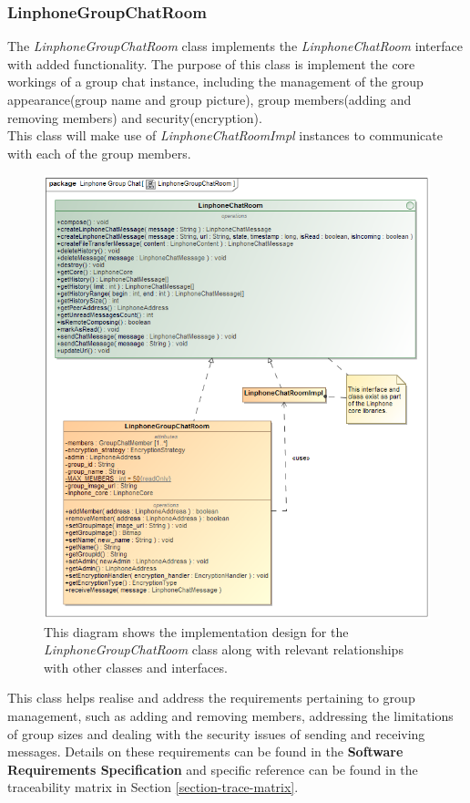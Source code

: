 \documentclass[11pt]{article}
\begin{document}
\subsubsection{LinphoneGroupChatRoom}\label{subsubsec: linphonegroupchatroom}
The \textit{LinphoneGroupChatRoom} class implements the \textit{LinphoneChatRoom} interface with added functionality. The purpose of this class is implement the core workings of a group chat instance, including the management of the group appearance(group name and group picture), group members(adding and removing members) and security(encryption).\\
This class will make use of \textit{LinphoneChatRoomImpl} instances to communicate with each of the group members.
\begin{figure}[H]
\centering
\includegraphics[width=5in]{./images/class_group_chat.png}
\caption[LinphoneGroupChatRoom Clas Diagram]{This diagram shows the implementation design for the \textit{LinphoneGroupChatRoom} class along with relevant relationships with other classes and interfaces.}
\label{cd-group-chat}
\end{figure}
This class helps realise and address the requirements pertaining to group management, such as adding and removing members, addressing the limitations of group sizes and dealing with the security issues of sending and receiving messages. Details on these requirements can be found in the \textbf{Software Requirements Specification} and specific reference can be found in the traceability matrix in Section \ref{section-trace-matrix}.
\end{document}
